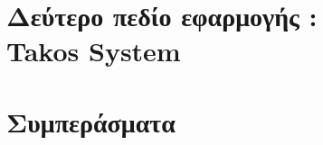 \documentclass[a4paper,12pt,twoside]{report}
\begin{document}
	\chapter{Δεύτερο πεδίο εφαρμογής :\\ Takos System}
		\label{κεφ.:Δεύτερο πεδίο εφαρμογής : Takos System}

	\chapter{Συμπεράσματα}
		\label{κεφ.:Συμπεράσματα}

\end{document}

